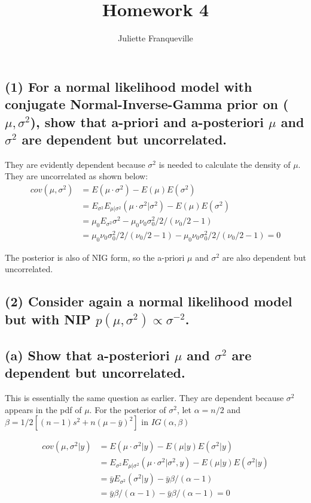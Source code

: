 \documentclass[11pt]{article}
\begin{document}
 
\title{Homework 4}
\author{Juliette Franqueville\\
}
\maketitle

\subsection*{(1) For a normal likelihood model with conjugate Normal-Inverse-Gamma prior on ($\mu, \sigma^2$), show that a-priori and a-posteriori $\mu$ and $\sigma^2$ are dependent but uncorrelated.}
They are evidently dependent because $\sigma^2$ is needed to calculate the density of $\mu$. They are uncorrelated as shown below:
\begin{align*}
    cov(\mu, \sigma^2) &= E(\mu \cdot \sigma^2) -  E(\mu)E(\sigma^2)\\
    &= E_{\sigma^2}E_{\mu|\sigma^2}(\mu \cdot \sigma^2|\sigma^2) -  E(\mu)E(\sigma^2)\\
    &=\mu_0 E_{\sigma^2}  \sigma^2 - \mu_0 \nu_0 \sigma^2_0/2/(\nu_0/2 - 1)\\
     &=\mu_0 \nu_0 \sigma^2_0/2/(\nu_0/2 - 1) - \mu_0 \nu_0 \sigma^2_0/2/(\nu_0/2 - 1) = 0
\end{align*}

The posterior is also of NIG form, so the a-priori $
\mu$ and $\sigma^2$ are also dependent but uncorrelated.


\subsection*{(2) Consider again a normal likelihood model but with NIP $p(\mu, \sigma^2) \propto \sigma^{-2}$.}



\subsection*{(a) Show that a-posteriori $\mu$ and $\sigma^2$ are dependent but uncorrelated.}



This is essentially the same question as earlier. They are dependent because $\sigma^2$ appears in the pdf of $\mu$. For the posterior of $\sigma^2$, let $\alpha = n/2$ and $\beta = 1/2[(n-1)s^2 + n(\mu - \bar{y})^2]$ in $IG(
\alpha, \beta)$

\begin{align*}
    cov(\mu, \sigma^2|y) &= E(\mu \cdot \sigma^2|y) -  E(\mu|y)E(\sigma^2|y)\\
    &= E_{\sigma^2}E_{\mu|\sigma^2}(\mu \cdot \sigma^2|\sigma^2, y) -  E(\mu|y)E(\sigma^2|y)\\
    &=\bar{y} E_{\sigma^2}  (\sigma^2|y) - \bar{y}\beta/(\alpha - 1)\\
    &= \bar{y}\beta/(\alpha - 1) - \bar{y}\beta/(\alpha - 1) = 0
\end{align*}
\end{document}
